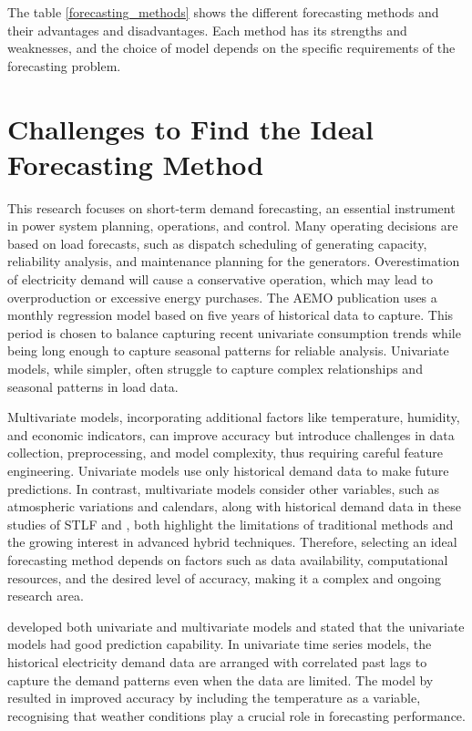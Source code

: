 \documentclass[mstat,12pt]{unswthesis}
\begin{document}
The table \ref{forecasting_methods} shows the different forecasting
methods and their advantages and disadvantages. Each method has its
strengths and weaknesses, and the choice of model depends on the
specific requirements of the forecasting problem. \bigskip

\section{Challenges to Find the Ideal Forecasting
Method}\label{challenges-to-find-the-ideal-forecasting-method}

This research focuses on short-term demand forecasting, an essential
instrument in power system planning, operations, and control. Many
operating decisions are based on load forecasts, such as dispatch
scheduling of generating capacity, reliability analysis, and maintenance
planning for the generators. Overestimation of electricity demand will
cause a conservative operation, which may lead to overproduction or
excessive energy purchases. The AEMO publication \cite{AEMO} uses a
monthly regression model based on five years of historical data to
capture. This period is chosen to balance capturing recent univariate
consumption trends while being long enough to capture seasonal patterns
for reliable analysis. Univariate models, while simpler, often struggle
to capture complex relationships and seasonal patterns in load data.

Multivariate models, incorporating additional factors like temperature,
humidity, and economic indicators, can improve accuracy but introduce
challenges in data collection, preprocessing, and model complexity, thus
requiring careful feature engineering. Univariate models use only
historical demand data to make future predictions. In contrast,
multivariate models consider other variables, such as atmospheric
variations and calendars, along with historical demand data in these
studies of STLF \cite{wang2016review} and \cite{chen2015electricity},
both highlight the limitations of traditional methods and the growing
interest in advanced hybrid techniques. Therefore, selecting an ideal
forecasting method depends on factors such as data availability,
computational resources, and the desired level of accuracy, making it a
complex and ongoing research area.

\cite{taylor2009forecasting} developed both univariate and multivariate
models and stated that the univariate models had good prediction
capability. In univariate time series models, the historical electricity
demand data are arranged with correlated past lags to capture the demand
patterns even when the data are limited. The model by
\cite{mcculloch2001forecasting} resulted in improved accuracy by
including the temperature as a variable, recognising that weather
conditions play a crucial role in forecasting performance.
\end{document}
